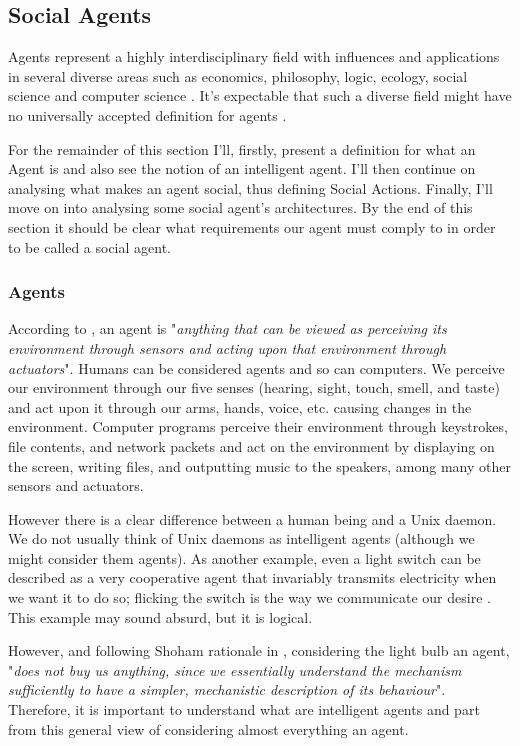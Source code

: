 \subsection{Social Agents}
Agents represent a highly interdisciplinary field with influences and applications in several diverse areas such as economics, philosophy, logic, ecology, social science and computer science \cite{wooldridge:multiagent-systems}.
It's expectable that such a diverse field might have no universally accepted definition for agents \cite{wooldridge:intelligentagents}.

For the remainder of this section I'll, firstly, present a definition for what an Agent is and also see the notion of an intelligent agent.
I'll then continue on analysing what makes an agent social, thus defining Social Actions.
Finally, I'll move on into analysing some social agent's architectures.
By the end of this section it should be clear what requirements our agent must comply to in order to be called a social agent.

\subsubsection{Agents}
According to \cite{russell&norvig:aima}, an agent is "\textit{anything that can be viewed as perceiving its environment through sensors and acting upon that environment through actuators}".
Humans can be considered agents and so can computers.
We perceive our environment through our five senses (hearing, sight, touch, smell, and taste) and act upon it through our arms, hands, voice, etc. causing changes in the environment.
Computer programs perceive their environment through keystrokes, file contents, and network packets and act on the environment by displaying on the screen, writing files, and outputting music to the speakers, among many other sensors and actuators.

However there is a clear difference between a human being and a Unix daemon.
We do not usually think of Unix daemons as intelligent agents (although we might consider them agents).
As another example, even a light switch can be described as a very cooperative agent that invariably transmits electricity when we want it to do so; flicking the switch is the way we communicate our desire \cite{shoham:agentorientedprogramming}.
This example may sound absurd, but it is logical.

However, and following Shoham rationale in \cite{shoham:agentorientedprogramming}, considering the light bulb an agent, "\textit{does not buy us anything, since we essentially understand the mechanism sufficiently to have a simpler, mechanistic description of its behaviour}".
Therefore, it is important to understand what are intelligent agents and part from this general view of considering almost everything an agent.

